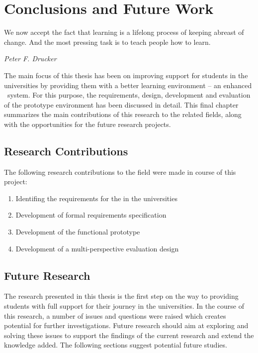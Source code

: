 \chapter{Conclusions and Future Work\label{cha:conclusion}}
\epigraph{We now accept the fact that learning is a lifelong process of keeping
abreast of change. And the most pressing task is to teach people how to
learn.}{\textit{Peter F. Drucker}}
The main focus of this thesis has been on improving \LLLs support for students
in the universities by providing them with a better learning environment -- an
enhanced \ep~system. For this purpose, the requirements, design, development and
evaluation of the prototype environment has been discussed in detail. This final
chapter summarizes the main contributions of this research to the related
fields, along with the opportunities for the future research projects.

\section{Research Contributions}

The following research contributions to the field were made in course of this
project:

\begin{enumerate}
  \item Identifing the requirements for the \LLLs in the universities
  \item Development of formal requirements specification
  \item Development of the functional prototype
  \item Development of a multi-perspective evaluation design
\end{enumerate}



\section{Future Research}
The research presented in this thesis is the first step on the way to providing
students with full support for their \LLLs journey in the universities. In the
course of this research, a number of issues and questions were raised which
creates potential for further investigations. Future research should aim at
exploring and solving these issues to support the findings of the current
research and extend the knowledge added. The following sections suggest
potential future studies.

